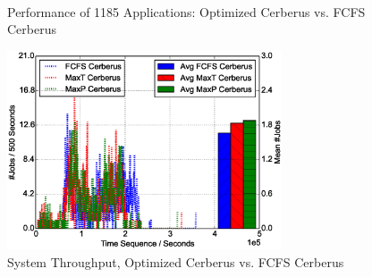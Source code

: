 \begin{figure}[!t]
        \centering
        ~
        \caption{Performance of 1185 Applications: Optimized Cerberus vs. FCFS Cerberus}
        \label{Fig:DPvsFIFOPerformance}
\end{figure}

\begin{figure}[!t]
        \centering
        \includegraphics[width=3.2in]{DrawDPvsFIFO/1000jobs_dp_vs_fifo_throughput}
        \caption{System Throughput, Optimized Cerberus vs. FCFS Cerberus}
        \label{Fig:DPvsFIFOThroughput}
\end{figure}

